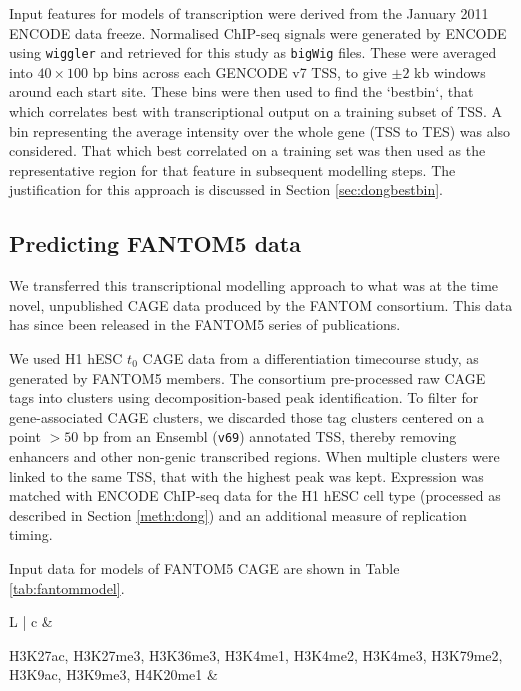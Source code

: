 \documentclass[a4paper,11pt,oneside]{book}
\begin{document}
Input features for models of transcription were derived from the January 2011 ENCODE data freeze.\cite{Dunham2012} Normalised ChIP-seq signals were generated by ENCODE using \texttt{wiggler} and retrieved for this study as \texttt{bigWig} files. These were averaged into $40 \times 100$ bp bins across each GENCODE v7 TSS, to give $\pm 2$ kb windows around each start site. These bins were then used to find the `bestbin`, that which correlates best with transcriptional output on a training subset of TSS. A bin representing the average intensity over the whole gene (TSS to TES) was also considered. That which best correlated on a training set was then used as the representative region for that feature in subsequent modelling steps.\cite{Dong2012} The justification for this approach is discussed in Section \ref{sec:dongbestbin}.

\subsection{Predicting FANTOM5 data}\label{meth:fantom5}

We transferred this transcriptional modelling approach to what was at the time novel, unpublished CAGE data produced by the FANTOM consortium. This data has since been released in the FANTOM5 series of publications.\cite{fantom5}

We used H1 hESC $t_0$ CAGE data from a differentiation timecourse study, as generated by FANTOM5 members. The consortium pre-processed raw CAGE tags into clusters using decomposition-based peak identification.\cite{fantom5} To filter for gene-associated CAGE clusters, we discarded those tag clusters centered on a point $>50$ bp from an Ensembl (\texttt{v69}) annotated TSS, thereby removing enhancers and other non-genic transcribed regions. When multiple clusters were linked to the same TSS, that with the highest peak was kept. Expression was matched with ENCODE ChIP-seq data for the H1 hESC cell type (processed as described in Section \ref{meth:dong}) and an additional measure of replication timing. 

Input data for models of FANTOM5 CAGE are shown in Table \ref{tab:fantommodel}.

\begin{table}[h]
\centering
\caption{ ENCODE datasets generated in the H1 hESC cell line and used in models of transcriptional output. }
\label{tab:fantommodel}
\begin{tabular}{L |  c} \toprule
{} &
 \\
\midrule

H3K27ac, 
H3K27me3, 
H3K36me3, 
H3K4me1, 
H3K4me2,  
H3K4me3, 
H3K79me2, 
H3K9ac, 
H3K9me3, 
H4K20me1 &

\\

\end{tabular}
\end{table}
\end{document}
